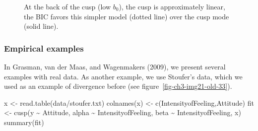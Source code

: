 \documentclass[
  a4paper,
  DIV=11,
  numbers=noendperiod,
  oneside]{scrreprt}
\newenvironment{Shaded}{}{}
\newcommand{\FunctionTok}[1]{\textcolor[rgb]{0.44,0.26,0.76}{#1}}
\newcommand{\NormalTok}[1]{\textcolor[rgb]{0.14,0.16,0.18}{#1}}
\newcommand{\OtherTok}[1]{\textcolor[rgb]{0.44,0.26,0.76}{#1}}
\newcommand{\SpecialCharTok}[1]{\textcolor[rgb]{0.00,0.36,0.77}{#1}}
\newcommand{\StringTok}[1]{\textcolor[rgb]{0.01,0.18,0.38}{#1}}
\begin{document}
\begin{figure}


\caption{\label{fig-ch3-img23-old-35}At the back of the cusp (low
\(b_0\)), the cusp is approximately linear, the BIC favors this simpler
model (dotted line) over the cusp mode (solid line).}

\end{figure}%

\subsubsection{Empirical examples}\label{sec-Empirical-examples}

In Grasman, van der Maas, and Wagenmakers (2009), we present several
examples with real data. As another example, we use Stoufer's data,
which we used as an example of divergence before (see
figure~\ref{fig-ch3-img21-old-33}).

\begin{Shaded}
\begin{Highlighting}[]
\NormalTok{x }\OtherTok{\textless{}{-}} \FunctionTok{read.table}\NormalTok{(}\StringTok{\textquotesingle{}data/stoufer.txt\textquotesingle{}}\NormalTok{)}
\FunctionTok{colnames}\NormalTok{(x) }\OtherTok{\textless{}{-}} \FunctionTok{c}\NormalTok{(}\StringTok{\textquotesingle{}IntensityofFeeling\textquotesingle{}}\NormalTok{,}\StringTok{\textquotesingle{}Attitude\textquotesingle{}}\NormalTok{)}
\NormalTok{fit }\OtherTok{\textless{}{-}} \FunctionTok{cusp}\NormalTok{(y }\SpecialCharTok{\textasciitilde{}}\NormalTok{ Attitude, alpha }\SpecialCharTok{\textasciitilde{}}\NormalTok{ IntensityofFeeling, }
\NormalTok{            beta }\SpecialCharTok{\textasciitilde{}}\NormalTok{ IntensityofFeeling, x)}
\FunctionTok{summary}\NormalTok{(fit)}
\end{Highlighting}
\end{Shaded}
\end{document}
